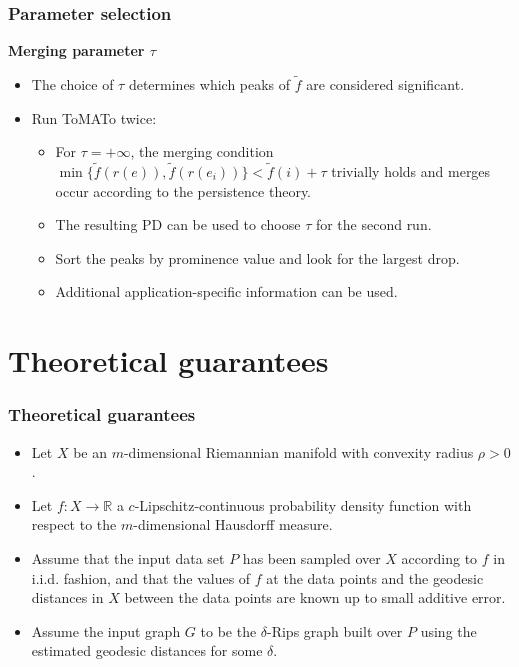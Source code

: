 \documentclass{beamer}
\theoremstyle{definition}
\newcommand{\R}{\mathbb{R}}
\begin{document}
\begin{frame}
\frametitle{Parameter selection}
\textbf{Merging parameter $\tau$}
\begin{itemize}
\item<1-> The choice of $\tau$ determines which peaks of $\tilde{f}$ are considered significant. %
\item<2-> Run ToMATo twice: 
\begin{itemize}
\item<3-> For $\tau=+\infty$, the merging condition $\min\{\tilde{f}(r(e)),\tilde{f}(r(e_i))\}<\tilde{f}(i)+\tau$ trivially holds and merges occur according to the persistence theory.
\item<4-> The resulting PD can be used to choose $\tau$ for the second run.
\item<5-> Sort the peaks by prominence value and look for the largest drop. %
\item<6-> Additional application-specific information can be used.
\end{itemize}
\end{itemize}
\end{frame}


\section{Theoretical guarantees}
\begin{frame}
\frametitle{Theoretical guarantees}
\begin{itemize}
\item<1-> Let $X$ be an $m$-dimensional Riemannian manifold with convexity radius $\rho>0$.
\item<2-> Let $f : X \to \R$ a $c$-Lipschitz-continuous probability density function with respect to the $m$-dimensional Hausdorff measure. 
\item<3-> Assume that the input data set $P$ has been sampled over $X$ according to $f$ in i.i.d. fashion, and that the values of $f$ at the data points and the geodesic distances in $X$ between the data points are known up to small additive error. 
\item<4-> Assume the input graph $G$ to be the $\delta$-Rips graph built over $P$ using the estimated geodesic distances for some $\delta$.
\end{itemize}
\end{frame}
\end{document}
